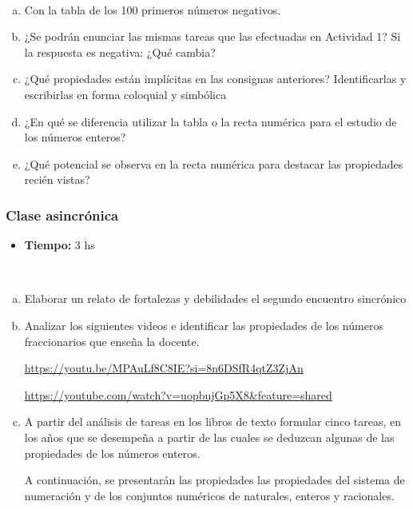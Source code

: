 \begin{actividad}
	~
	\begin{enumerate}[a.]
		\item Con la tabla de los 100 primeros números negativos.
		\item ¿Se podrán enunciar las mismas tareas que las efectuadas en Actividad 1? Si la respuesta es negativa: ¿Qué cambia?
		\item ¿Qué propiedades están implícitas en las consignas anteriores? Identificarlas y escribirlas en forma coloquial y simbólica
		\item ¿En qué se diferencia utilizar la tabla o la recta numérica para el estudio de los números enteros?
		\item ¿Qué potencial se observa en la recta numérica para destacar las propiedades recién vistas?
	\end{enumerate}
\end{actividad}

\subsubsection{Clase asincrónica}

\begin{itemize}
	\item \textbf{Tiempo:} 3 hs
\end{itemize}

\begin{actividad}
	~
	\begin{enumerate}[a.]
		\item Elaborar un relato de fortalezas y debilidades el segundo encuentro sincrónico
		\item Analizar los siguientes videos e identificar las propiedades de los números fraccionarios que enseña la docente.
		
		\url{https://youtu.be/MPAuLf8C8IE?si=8n6DSfR4qtZ3ZjAn}
		
		\url{https://youtube.com/watch?v=uopbujGp5X8&feature=shared}
		
		\item A partir del análisis de tareas en los libros de texto formular cinco tareas, en los años que se desempeña a partir de las cuales se deduzcan algunas de las propiedades de los números enteros.
		
		A continuación, se presentarán las propiedades las propiedades del sistema de numeración y de los conjuntos numéricos de naturales, enteros y racionales.
	\end{enumerate}
\end{actividad}

